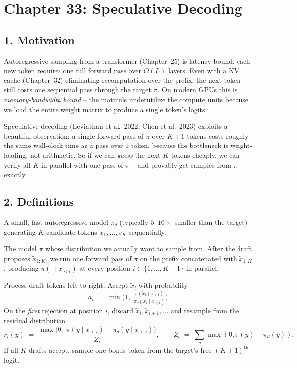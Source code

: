 \section*{Chapter 33: Speculative Decoding}

\subsection*{1. Motivation}

Autoregressive sampling from a transformer (Chapter~25) is latency-bound: each new token requires one full forward pass over $O(L)$ layers. Even with a KV cache (Chapter~32) eliminating recomputation over the prefix, the next token still costs one sequential pass through the target $\pi$. On modern GPUs this is \emph{memory-bandwidth bound} -- the matmuls underutilize the compute units because we load the entire weight matrix to produce a single token's logits.

Speculative decoding (Leviathan et al.\ 2022; Chen et al.\ 2023) exploits a beautiful observation: a single forward pass of $\pi$ over $K+1$ tokens costs roughly the same wall-clock time as a pass over $1$ token, because the bottleneck is weight-loading, not arithmetic. So if we can \emph{guess} the next $K$ tokens cheaply, we can verify all $K$ in parallel with one pass of $\pi$ -- and provably get samples from $\pi$ exactly.

\subsection*{2. Definitions}

\begin{definition}
A small, fast autoregressive model $\pi_d$ (typically $5$--$10\times$ smaller than the target) generating $K$ candidate tokens $\tilde x_1, \ldots, \tilde x_K$ sequentially.
\end{definition}

\begin{definition}
The model $\pi$ whose distribution we actually want to sample from. After the draft proposes $\tilde x_{1:K}$, we run one forward pass of $\pi$ on the prefix concatenated with $\tilde x_{1:K}$, producing $\pi(\cdot \mid x_{<i})$ at every position $i \in \{1,\ldots,K+1\}$ in parallel.
\end{definition}

\begin{definition}
Process draft tokens left-to-right. Accept $\tilde x_i$ with probability
\[
a_i \;=\; \min\!\Big(1,\; \tfrac{\pi(\tilde x_i \mid x_{<i})}{\pi_d(\tilde x_i \mid x_{<i})}\Big).
\]
On the \emph{first} rejection at position $i$, discard $\tilde x_i, \tilde x_{i+1}, \ldots$ and resample from the residual distribution
\[
r_i(y) \;=\; \frac{\max\!\big(0,\; \pi(y \mid x_{<i}) - \pi_d(y \mid x_{<i})\big)}{Z_i}, \qquad Z_i \;=\; \sum_y \max(0, \pi(y) - \pi_d(y)).
\]
If all $K$ drafts accept, sample one bonus token from the target's free $(K{+}1)^{\text{th}}$ logit.
\end{definition}

